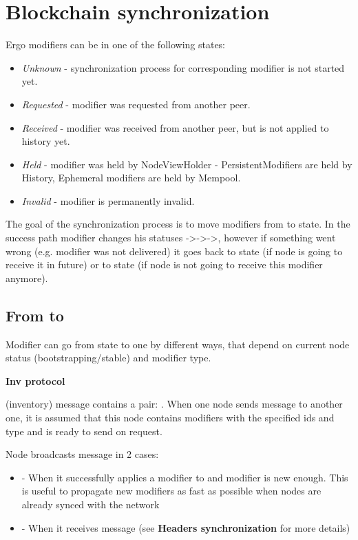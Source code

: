 
\section{Blockchain synchronization}

Ergo modifiers can be in one of the following states:

\begin{itemize}
    \item{\em Unknown} - synchronization process for corresponding modifier is not started yet.
    \item{\em Requested} - modifier was requested from another peer.
    \item{\em Received} - modifier was received from another peer, but is not applied to history yet.
    \item{\em Held} - modifier was held by NodeViewHolder - PersistentModifiers are held by History,
    Ephemeral modifiers are held by Mempool.
    \item{\em Invalid} - modifier is permanently invalid.
\end{itemize}

The goal of the synchronization process is to move modifiers from  to  state.
In the success path modifier changes his statuses ->->->,
however if something went wrong (e.g. modifier was not delivered) it goes back to  state
(if node is going to receive it in future) or to state (if node is not going to receive
this modifier anymore).

\subsection{From  to }

Modifier can go from  state to  one by different ways, that depend on
current node status (bootstrapping/stable) and modifier type.

\textbf{Inv protocol}

 (inventory) message contains a pair: .
When one node sends  message to another one, it is assumed that this node
contains modifiers with the specified ids and type and is ready to send on request.

Node broadcasts  message in 2 cases:
\begin{itemize}
    \item - When it successfully applies a modifier to  and modifier is new enough.
    This is useful to propagate new modifiers as fast as possible when nodes are already synced with the network
    \item - When it receives  message (see \textbf{Headers synchronization} for more details)
\end{itemize}

